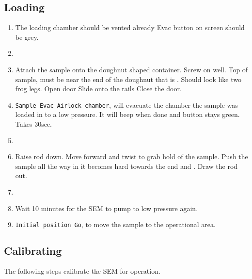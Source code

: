   \subsection{Loading}
  \begin{enumerate}
  \item The loading chamber should  be vented already \ira Evac button
    on screen should be grey.
  \item {}
  \item Attach the sample onto the doughnut shaped container. Screw on
    well. Top of sample, must be near  the end of the doughnut that is
    . Should look like two frog legs.  Open door \ira
    Slide  onto the  rails  Close the door.
  \item \texttt{Sample \ira Evac  \ira Airlock chamber}, will evacuate
    the chamber  the sample was loaded  in to a low  pressure. It will
    beep when done and button stays green. Takes 30sec.
  \item {}
  \item Raise rod  down.  Move forward
    {and twist}  to grab hold of  the sample. Push the  sample all the
    way  in {it  becomes hard  towards the  end} and  . Draw the rod out.
  \item {}
  \item Wait 10 minutes for the SEM to pump to low pressure again.
  \item \texttt{Initial position  \ira Go}, to move the  sample to the
    operational area.
  \end{enumerate}

  \subsection{Calibrating}
  The following steps calibrate the SEM for operation.

